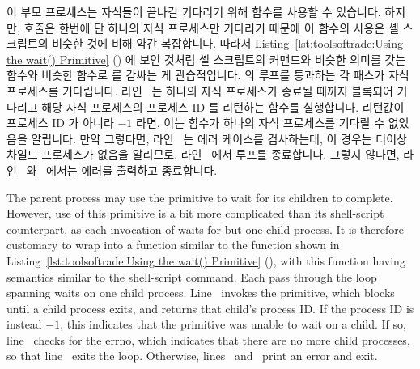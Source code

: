 \begin{fcvref}
이 부모 프로세스는 자식들이 끝나길 기다리기 위해  함수를 사용할
수 있습니다.
하지만,  호출은 한번에 단 하나의 자식 프로세스만 기다리기 때문에 이
함수의 사용은 셸 스크립트의 비슷한 것에 비해 약간 복잡합니다.
따라서
Listing~\ref{lst:toolsoftrade:Using the wait() Primitive}
() 에 보인 것처럼 셸 스크립트의  커맨드와 비슷한
의미를 갖는  함수와 비슷한 함수로  를 감싸는 게
관습적입니다.
 의 루프를 통과하는 각 패스가 자식 프로세스를
기다립니다.
라인~ 는 하나의 자식 프로세스가 종료될 때까지 블록되어 기다리고
해당 자식 프로세스의 프로세스 ID 를 리턴하는  함수를 실행합니다.
리턴값이 프로세스 ID 가 아니라 $-1$ 라면, 이는  함수가 하나의 자식
프로세스를 기다릴 수 없었음을 알립니다.
만약 그렇다면, 라인~ 는  에러 케이스를 검사하는데, 이
경우는 더이상 차일드 프로세스가 없음을 알리므로, 라인~ 에서 루프를
종료합니다.
그렇지 않다면, 라인~ 와~ 에서는 에러를 출력하고
종료합니다.
\end{fcvref}

\iffalse

\begin{fcvref}
The parent process may use the  primitive to wait for its children
to complete.
However, use of this primitive is a bit more complicated than its shell-script
counterpart, as each invocation of  waits for but one child
process.
It is therefore customary to wrap  into a function similar
to the  function shown in
Listing~\ref{lst:toolsoftrade:Using the wait() Primitive}
(),
with this  function having semantics similar to the
shell-script  command.
Each pass through the loop spanning 
waits on one child process.
Line~ invokes the  primitive, which blocks
until a child process exits, and returns that child's process ID\@.
If the process ID is instead $-1$, this indicates that the 
primitive was unable to wait on a child.
If so, line~ checks for the  errno, which
indicates that there are no more child processes, so that
line~ exits the loop.
Otherwise, lines~ and~ print an error and exit.
\end{fcvref}

